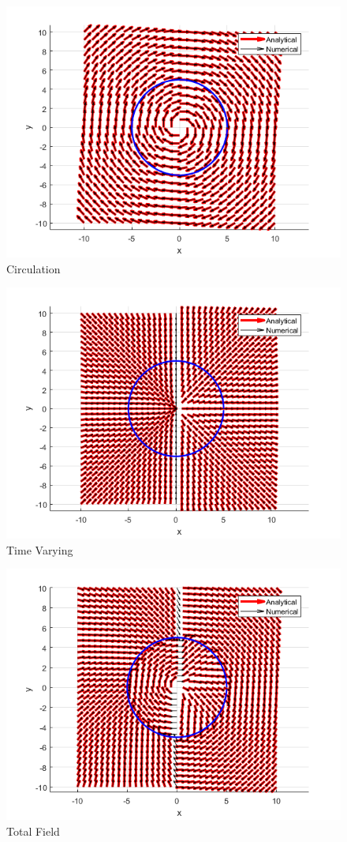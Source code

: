 \documentclass[numbered,pdftex]{ohio-etd}
\begin{document}
\begin{figure}[h]
	\centering
	\includegraphics[width=0.7\linewidth]{PaperFigures/circulation}
	\caption{Circulation}
	\label{fig:circulation}
\end{figure}

\begin{figure}[h]
	\centering
	\includegraphics[width=0.7\linewidth]{"PaperFigures/time varying"}
	\caption{Time Varying}
	\label{fig:time-varying}
\end{figure}


\begin{figure}[h]
	\centering
	\includegraphics[width=0.7\linewidth]{PaperFigures/total}
	\caption{Total Field}
	\label{fig:total}
\end{figure}
\end{document}
